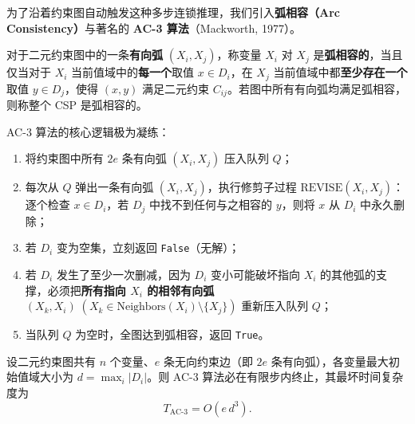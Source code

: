 为了沿着约束图自动触发这种多步连锁推理，我们引入\textbf{弧相容（Arc Consistency）}与著名的 \textbf{AC-3 算法}（Mackworth, 1977）。

\begin{defBox}
\begin{definition}\label{def:arc-consistency}
对于二元约束图中的一条\textbf{有向弧} $(X_i, X_j)$，称变量 $X_i$ 对 $X_j$ 是\textbf{弧相容的}，当且仅当对于 $X_i$ 当前值域中的\textbf{每一个}取值 $x \in D_i$，在 $X_j$ 当前值域中都\textbf{至少存在一个}取值 $y \in D_j$，使得 $(x, y)$ 满足二元约束 $C_{ij}$。若图中所有有向弧均满足弧相容，则称整个 CSP 是弧相容的。
\end{definition}
\end{defBox}

AC-3 算法的核心逻辑极为凝练：
\begin{enumerate}
  \item 将约束图中所有 $2e$ 条有向弧 $(X_i, X_j)$ 压入队列 $Q$；
  \item 每次从 $Q$ 弹出一条有向弧 $(X_i, X_j)$，执行修剪子过程 $\mathrm{REVISE}(X_i, X_j)$：逐个检查 $x \in D_i$，若 $D_j$ 中找不到任何与之相容的 $y$，则将 $x$ 从 $D_i$ 中永久删除；
  \item 若 $D_i$ 变为空集，立刻返回 \texttt{False}（无解）；
  \item 若 $D_i$ 发生了至少一次删减，因为 $D_i$ 变小可能破坏指向 $X_i$ 的其他弧的支撑，必须把\textbf{所有指向 $X_i$ 的相邻有向弧} $(X_k, X_i)\;(X_k \in \text{Neighbors}(X_i) \setminus \{X_j\})$ 重新压入队列 $Q$；
  \item 当队列 $Q$ 为空时，全图达到弧相容，返回 \texttt{True}。
\end{enumerate}

\begin{thmBox}
\begin{theorem}[AC-3 算法的时间复杂度定理]\label{thm:ac3-complexity}
设二元约束图共有 $n$ 个变量、$e$ 条无向约束边（即 $2e$ 条有向弧），各变量最大初始值域大小为 $d = \max_i |D_i|$。则 AC-3 算法必在有限步内终止，其最坏时间复杂度为
\begin{equation}\label{eq:ac3-time}
  T_{\text{AC-3}} = O\!\left(e\, d^3\right).
\end{equation}
\end{theorem}
\end{thmBox}

